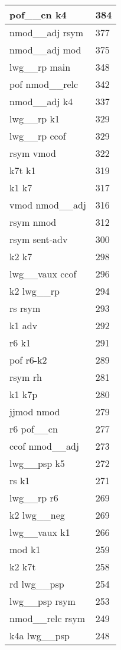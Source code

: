 \documentclass[a4 paper]{article}
\begin{document}
\begin{longtable}{p{}p{}}
pof\_\_cn k4  & 384 \\ \midrule
nmod\_\_adj rsym  & 377 \\ \midrule
nmod\_\_adj mod  & 375 \\ \midrule
lwg\_\_rp main  & 348 \\ \midrule
pof nmod\_\_relc  & 342 \\ \midrule
nmod\_\_adj k4  & 337 \\ \midrule
lwg\_\_rp k1  & 329 \\ \midrule
lwg\_\_rp ccof  & 329 \\ \midrule
rsym vmod  & 322 \\ \midrule
k7t k1  & 319 \\ \midrule
k1 k7  & 317 \\ \midrule
vmod nmod\_\_adj  & 316 \\ \midrule
rsym nmod  & 312 \\ \midrule
rsym sent-adv  & 300 \\ \midrule
k2 k7  & 298 \\ \midrule
lwg\_\_vaux ccof  & 296 \\ \midrule
k2 lwg\_\_rp  & 294 \\ \midrule
rs rsym  & 293 \\ \midrule
k1 adv  & 292 \\ \midrule
r6 k1  & 291 \\ \midrule
pof r6-k2  & 289 \\ \midrule
rsym rh  & 281 \\ \midrule
k1 k7p  & 280 \\ \midrule
jjmod nmod  & 279 \\ \midrule
r6 pof\_\_cn  & 277 \\ \midrule
ccof nmod\_\_adj  & 273 \\ \midrule
lwg\_\_psp k5  & 272 \\ \midrule
rs k1  & 271 \\ \midrule
lwg\_\_rp r6  & 269 \\ \midrule
k2 lwg\_\_neg  & 269 \\ \midrule
lwg\_\_vaux k1  & 266 \\ \midrule
mod k1  & 259 \\ \midrule
k2 k7t  & 258 \\ \midrule
rd lwg\_\_psp  & 254 \\ \midrule
lwg\_\_psp rsym  & 253 \\ \midrule
nmod\_\_relc rsym  & 249 \\ \midrule
k4a lwg\_\_psp  & 248 \\ \midrule

\end{longtable}
\end{document}
